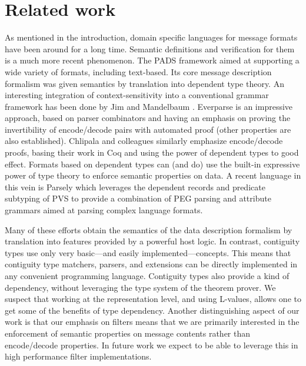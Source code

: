 \documentclass[a4paper,UKenglish,cleveref, autoref, thm-restate]{lipics-v2021}
\begin{document}
\section {Related work}

As mentioned in the introduction, domain specific languages for
message formats have been around for a long time. Semantic definitions
and verification for them is a much more recent phenomenon. The PADS
framework \cite{pads:ddl} aimed at supporting a wide variety of
formats, including text-based. Its core message description formalism
was given semantics by translation into dependent type theory. An
interesting integration of context-sensitivity into a conventional
grammar framework has been done by Jim and Mandelbaum
\cite{trevor-jim-dependent-parsing}. Everparse \cite{everparse} is an
impressive approach, based on parser combinators and having an
emphasis on proving the invertibility of encode/decode pairs with
automated proof (other properties are also established). Chlipala and
colleagues \cite{narcissus-encode-decode} similarly emphasize
encode/decode proofs, basing their work in Coq and using the power of
dependent types to good effect. Formats based on dependent types can
(and do) use the built-in expressive power of type theory to enforce
semantic properties on data. A recent language in this vein is Parsely
\cite{parsley:sri} which leverages the dependent records and predicate
subtyping of PVS to provide a combination of PEG parsing and attribute
grammars aimed at parsing complex language formats.

Many of these efforts obtain the semantics of the data description
formalism by translation into features provided by a powerful host
logic. In contrast, contiguity types use only very basic---and easily
implemented---concepts. This means that contiguity type matchers,
parsers, and extensions can be directly implemented in any convenient
programming language.  Contiguity types also provide a kind of
dependency, without leveraging the type system of the theorem
prover. We suspect that working at the representation level, and using
L-values, allows one to get some of the benefits of type
dependency. Another distinguishing aspect of our work is that our
emphasis on filters means that we are primarily interested in the
enforcement of semantic properties on message contents rather than
encode/decode properties. In future work we expect to be able to
leverage this in high performance filter implementations.


\end{document}
